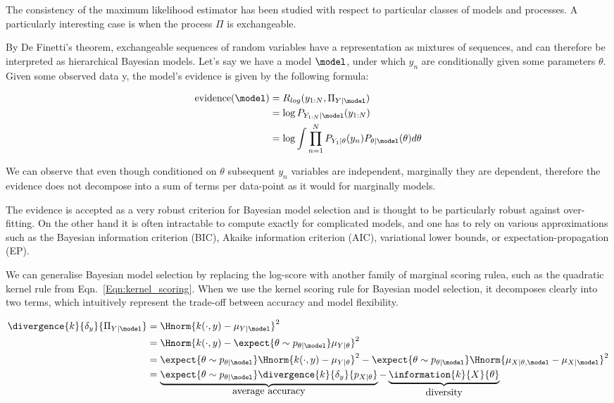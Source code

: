 The consistency of the maximum likelihood estimator has been studied with respect to particular classes of models and processes. A particularly interesting case is when the process $\Pi$ is exchangeable.

By De Finetti's theorem, exchangeable sequences of random variables have a representation as mixtures of \iid sequences, and can therefore be interpreted as hierarchical Bayesian models. Let's say we have a model $\model$, under which $y_n$ are conditionally \iid given some parameters $\theta$. Given some observed data y, the model's evidence is given by the following formula:

\begin{align}
	\mbox{evidence}(\model) &= R_{log}(y_{1:N},\Pi_{Y\vert\model})\\
		&= \log P_{Y_{1:N}\vert\model}(y_{1:N})\\
		&= \log \int \prod_{n=1}^{N} P_{Y_1\vert\theta}(y_n) P_{\theta\vert\model}(\theta) d\theta
\end{align}

We can observe that even though conditioned on $\theta$ subsequent $y_n$ variables are independent, marginally they are dependent, therefore the evidence does not decompose into a sum of terms per data-point as it would for marginally \iid models.

The evidence is accepted as a very robust criterion for Bayesian model selection and is thought to be particularly robust against over-fitting. On the other hand it is often intractable to compute exactly for complicated models, and one has to rely on various approximations such as the Bayesian information criterion (BIC)\citep{}, Akaike information criterion (AIC)\citep{}, variational lower bounds, or expectation-propagation (EP)\citep{}.

We can generalise Bayesian model selection by replacing the log-score with another family of marginal scoring rulea, such as the quadratic kernel rule from Eqn.\ \eqref{Eqn:kernel_scoring}. When we use the kernel scoring rule for Bayesian model selection, it decomposes clearly into two terms, which intuitively represent the trade-off between accuracy and model flexibility.

\begin{align}
	\divergence{k}{\delta_{y}}{\Pi_{Y\vert\model}} &= \Hnorm{k(\cdot,y) - \mu_{Y\vert\model}}^2\\
		&= \Hnorm{k(\cdot,y) - \expect{\theta\sim p_{\theta\vert\model}}\mu_{Y\vert\theta}}^2\\
		&= \expect{\theta\sim p_{\theta\vert\model}} \Hnorm{k(\cdot,y) - \mu_{Y\vert\theta}}^2 - \expect{\theta\sim p_{\theta\vert\model}}\Hnorm{\mu_{X\vert \theta,\model} - \mu_{X\vert\model}}^2\\
		&= \underbrace{\expect{\theta\sim p_{\theta\vert\model}} \divergence{k}{\delta_{y}}{p_{X\vert\theta}} }_{\mbox{average accuracy}} -  \underbrace{\information{k}{X}{\theta}}_{\mbox{diversity}}
\end{align}

